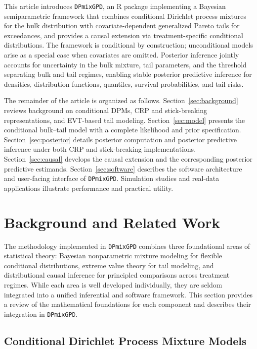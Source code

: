 \documentclass[article]{jss}\usepackage[]{graphicx}\usepackage[]{xcolor}
\begin{document}
This article introduces \texttt{DPmixGPD}, an \textsf{R} package implementing a Bayesian semiparametric framework that combines conditional Dirichlet process mixtures for the bulk distribution with covariate-dependent generalized Pareto tails for exceedances, and provides a causal extension via treatment-specific conditional distributions.
The framework is conditional by construction; unconditional models arise as a special case when covariates are omitted.
Posterior inference jointly accounts for uncertainty in the bulk mixture, tail parameters, and the threshold separating bulk and tail regimes, enabling stable posterior predictive inference for densities, distribution functions, quantiles, survival probabilities, and tail risks.

The remainder of the article is organized as follows.
Section~\ref{sec:background} reviews background on conditional DPMs, CRP and stick-breaking representations, and EVT-based tail modeling.
Section~\ref{sec:model} presents the conditional bulk--tail model with a complete likelihood and prior specification.
Section~\ref{sec:posterior} details posterior computation and posterior predictive inference under both CRP and stick-breaking implementations.
Section~\ref{sec:causal} develops the causal extension and the corresponding posterior predictive estimands.
Section~\ref{sec:software} describes the software architecture and user-facing interface of \texttt{DPmixGPD}.
Simulation studies and real-data applications illustrate performance and practical utility.

\section{Background and Related Work}

The methodology implemented in \texttt{DPmixGPD} combines three foundational areas of statistical theory: Bayesian nonparametric mixture modeling for flexible conditional distributions, extreme value theory for tail modeling, and distributional causal inference for principled comparisons across treatment regimes. While each area is well developed individually, they are seldom integrated into a unified inferential and software framework. This section provides a review of the mathematical foundations for each component and describes their integration in \texttt{DPmixGPD}.

\subsection{Conditional Dirichlet Process Mixture Models}
\end{document}
